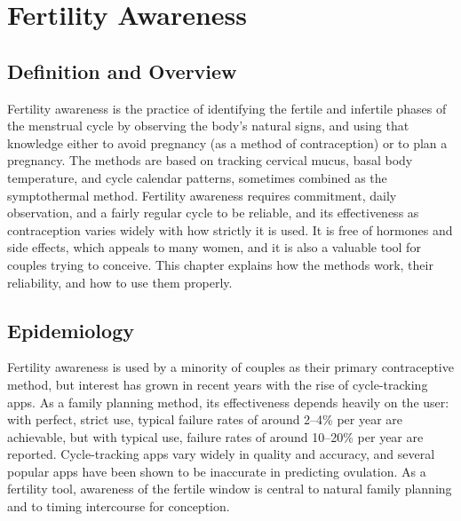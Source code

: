 \chapter{Fertility Awareness}

\section*{Definition and Overview}
Fertility awareness is the practice of identifying the fertile and infertile phases of the menstrual cycle by observing the body's natural signs, and using that knowledge either to avoid pregnancy (as a method of contraception) or to plan a pregnancy. The methods are based on tracking cervical mucus, basal body temperature, and cycle calendar patterns, sometimes combined as the symptothermal method. Fertility awareness requires commitment, daily observation, and a fairly regular cycle to be reliable, and its effectiveness as contraception varies widely with how strictly it is used. It is free of hormones and side effects, which appeals to many women, and it is also a valuable tool for couples trying to conceive. This chapter explains how the methods work, their reliability, and how to use them properly.

\section*{Epidemiology}
Fertility awareness is used by a minority of couples as their primary contraceptive method, but interest has grown in recent years with the rise of cycle-tracking apps. As a family planning method, its effectiveness depends heavily on the user: with perfect, strict use, typical failure rates of around 2--4\% per year are achievable, but with typical use, failure rates of around 10--20\% per year are reported. Cycle-tracking apps vary widely in quality and accuracy, and several popular apps have been shown to be inaccurate in predicting ovulation. As a fertility tool, awareness of the fertile window is central to natural family planning and to timing intercourse for conception.

